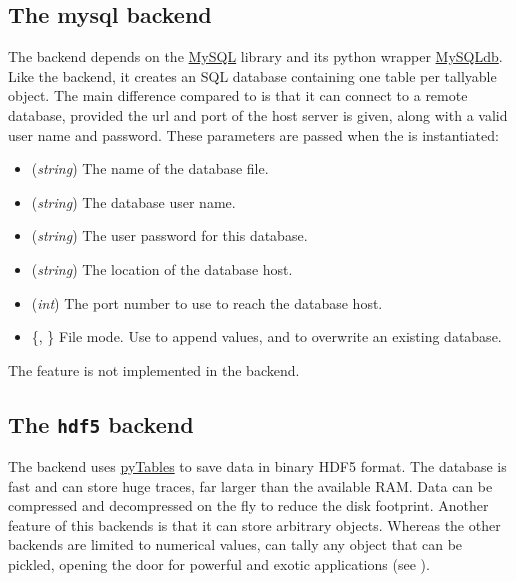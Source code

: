 \documentclass[letterpaper,10pt,english]{sphinxmanual}
\begin{document}
\subsection{The mysql backend}
\label{database:sqlite3}\label{database:the-mysql-backend}
The  backend depends on the \href{http://www.mysql.com/downloads/}{MySQL} library and its python wrapper \href{http://sourceforge.net/projects/mysql-python}{MySQLdb}. Like the  backend, it creates an SQL database containing one table per tallyable object. The main difference compared to  is that it can connect to a remote database, provided the url and port of the host server is given, along with a valid user name and password. These parameters are passed when the  is instantiated:
\begin{itemize}
\item {} 
 (\emph{string}) The name of the database file.

\item {} 
 (\emph{string}) The database user name.

\item {} 
 (\emph{string}) The user password for this database.

\item {} 
 (\emph{string}) The location of the database host.

\item {} 
 (\emph{int})    The port number to use to reach the database host.

\item {} 
 \{, \} File mode.  Use  to append values, and  to overwrite an existing database.

\end{itemize}

The  feature is not implemented in the  backend.


\subsection{The \texttt{hdf5} backend}
\label{database:mysqldb}\label{database:the-hdf5-backend}
The  backend uses \href{http://www.pytables.org/moin}{pyTables} to save data in binary HDF5 format. The  database is fast and can store huge traces, far larger than the available RAM. Data can be compressed and decompressed on the fly to
reduce the disk footprint. Another feature of this backends is that it can store arbitrary objects. Whereas the other backends are limited to numerical values,  can tally any object that can be pickled, opening the door for powerful and exotic applications (see ).
\end{document}
